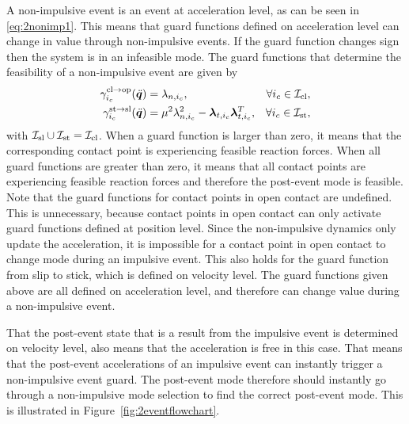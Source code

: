 \documentclass[../DC2017114Bouma.tex]{subfiles}
\begin{document}
A non-impulsive event is an event at acceleration level, as can be seen in \eqref{eq:2nonimp1}. This means that guard functions defined on acceleration level can change in value through non-impulsive events. If the guard function changes sign then the system is in an infeasible mode. The guard functions that determine the feasibility of a non-impulsive event are given by
\begin{align}
\gamma^{\text{cl}\rightarrow\text{op}}_{i_c}(\ddot{{\boldsymbol{q}}}) &= \lambda_{n,i_c}, & \forall i_c\in\mathcal{I}_{\text{cl}},\\
\gamma^{\text{st}\rightarrow\text{sl}}_{i_c}(\ddot{{\boldsymbol{q}}}) &= \mu^2\lambda_{n,i_c}^2 - \boldsymbol{\lambda}_{t,i_c}\boldsymbol{\lambda}_{t,i_c}^T, & \forall i_c\in\mathcal{I}_{\text{st}},
\end{align}
with $\mathcal{I}_{\text{sl}}\cup\mathcal{I}_{\text{st}}=\mathcal{I}_{\text{cl}}$. When a guard function is larger than zero, it means that the corresponding contact point is experiencing feasible reaction forces. When all guard functions are greater than zero, it means that all contact points are experiencing feasible reaction forces and therefore the post-event mode is feasible. Note that the guard functions for contact points in open contact are undefined. This is unnecessary, because contact points in open contact can only activate guard functions defined at position level. Since the non-impulsive dynamics only update the acceleration, it is impossible for a contact point in open contact to change mode during an impulsive event. This also holds for the guard function from slip to stick, which is defined on velocity level. The guard functions given above are all defined on acceleration level, and therefore can change value during a non-impulsive event.

That the post-event state that is a result from the impulsive event is determined on velocity level, also means that the acceleration is free in this case. That means that the post-event accelerations of an impulsive event can instantly trigger a non-impulsive event guard. The post-event mode therefore should instantly go through a non-impulsive mode selection to find the correct post-event mode. This is illustrated in Figure~\ref{fig:2eventflowchart}.
\end{document}

